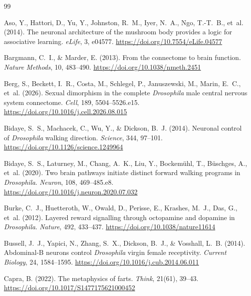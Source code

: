 \documentclass[11pt,a4paper]{article}
\begin{document}
\begin{thebibliography}{99}


Aso, Y., Hattori, D., Yu, Y., Johnston, R.~M., Iyer, N.~A., Ngo, T.-T.~B., et~al. (2014). The neuronal architecture of the mushroom body provides a logic for associative learning. \emph{eLife}, 3, e04577. \url{https://doi.org/10.7554/eLife.04577}

Bargmann, C.~I., \& Marder, E. (2013). From the connectome to brain function. \emph{Nature Methods}, 10, 483--490. \url{https://doi.org/10.1038/nmeth.2451}

Berg, S., Beckett, I.~R., Costa, M., Schlegel, P., Januszewski, M., Marin, E.~C., et~al. (2026). Sexual dimorphism in the complete \emph{Drosophila} male central nervous system connectome. \emph{Cell}, 189, 5504--5526.e15. \url{https://doi.org/10.1016/j.cell.2026.08.015}

Bidaye, S.~S., Machacek, C., Wu, Y., \& Dickson, B.~J. (2014). Neuronal control of \emph{Drosophila} walking direction. \emph{Science}, 344, 97--101. \url{https://doi.org/10.1126/science.1249964}

Bidaye, S.~S., Laturney, M., Chang, A.~K., Liu, Y., Bockem\"{u}hl, T., B\"{u}schges, A., et~al. (2020). Two brain pathways initiate distinct forward walking programs in \emph{Drosophila}. \emph{Neuron}, 108, 469--485.e8. \url{https://doi.org/10.1016/j.neuron.2020.07.032}

Burke, C.~J., Huetteroth, W., Owald, D., Perisse, E., Krashes, M.~J., Das, G., et~al. (2012). Layered reward signalling through octopamine and dopamine in \emph{Drosophila}. \emph{Nature}, 492, 433--437. \url{https://doi.org/10.1038/nature11614}

Bussell, J.~J., Yapici, N., Zhang, S.~X., Dickson, B.~J., \& Vosshall, L.~B. (2014). Abdominal-B neurons control \emph{Drosophila} virgin female receptivity. \emph{Current Biology}, 24, 1584--1595. \url{https://doi.org/10.1016/j.cub.2014.06.011}

Capra, B. (2022). The metaphysics of farts. \emph{Think}, 21(61), 39--43. \url{https://doi.org/10.1017/S1477175621000452}


\end{thebibliography}
\end{document}
